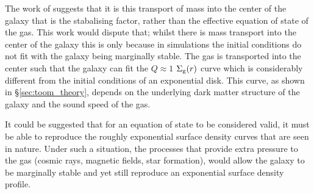 The work of \citet{krumholz_is_2016} suggests that it is this transport of mass into the center of the galaxy that is the stabalising factor, rather than the effective equation of state of the gas.
This work would dispute that; whilst there is mass transport into the center of the galaxy this is only because in simulations the initial conditions do not fit with the galaxy being marginally stable.
The gas is transported into the center such that the galaxy can fit the $Q\approx1$ $\Sigma_\mathrm{g}(r)$ curve which is considerably different from the initial conditions of an exponential disk.
This curve, as shown in \S \ref{sec:toom_theory}, depends on the underlying dark matter structure of the galaxy and the sound speed of the gas.

It could be suggested that for an equation of state to be considered valid, it must be able to reproduce the roughly exponential surface density curves that are seen in nature.
Under such a situation, the processes that provide extra pressure to the gas (cosmic rays, magnetic fields, star formation), would allow the galaxy to be marginally stable and yet still reproduce an exponential surface density profile.
